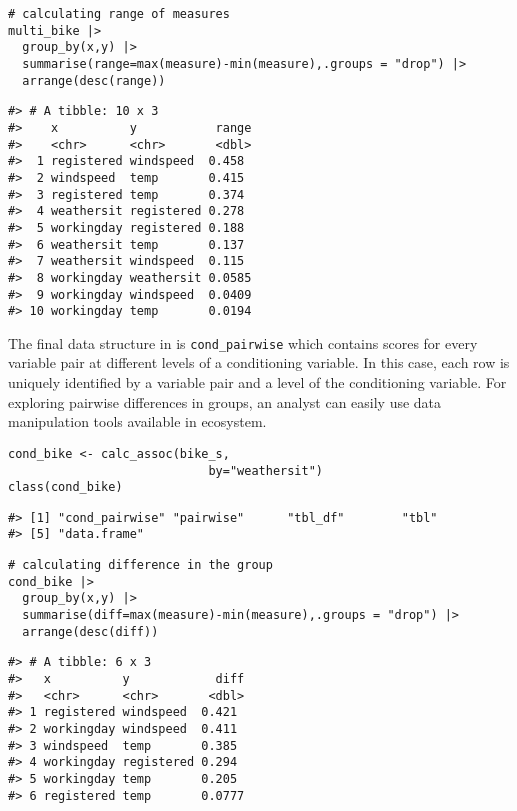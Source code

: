 \begin{verbatim}
# calculating range of measures
multi_bike |> 
  group_by(x,y) |>
  summarise(range=max(measure)-min(measure),.groups = "drop") |>
  arrange(desc(range))
\end{verbatim}

\begin{verbatim}
#> # A tibble: 10 x 3
#>    x          y           range
#>    <chr>      <chr>       <dbl>
#>  1 registered windspeed  0.458 
#>  2 windspeed  temp       0.415 
#>  3 registered temp       0.374 
#>  4 weathersit registered 0.278 
#>  5 workingday registered 0.188 
#>  6 weathersit temp       0.137 
#>  7 weathersit windspeed  0.115 
#>  8 workingday weathersit 0.0585
#>  9 workingday windspeed  0.0409
#> 10 workingday temp       0.0194
\end{verbatim}

The final data structure in  is \texttt{cond\_pairwise} which contains scores for every variable pair at different levels of a conditioning variable. In this case, each row is uniquely identified by a variable pair and a level of the conditioning variable. For exploring pairwise differences in groups, an analyst can easily use data manipulation tools available in  ecosystem.

\begin{verbatim}
cond_bike <- calc_assoc(bike_s,
                            by="weathersit")
class(cond_bike)
\end{verbatim}

\begin{verbatim}
#> [1] "cond_pairwise" "pairwise"      "tbl_df"        "tbl"          
#> [5] "data.frame"
\end{verbatim}

\begin{verbatim}
# calculating difference in the group
cond_bike |> 
  group_by(x,y) |>
  summarise(diff=max(measure)-min(measure),.groups = "drop") |>
  arrange(desc(diff))
\end{verbatim}

\begin{verbatim}
#> # A tibble: 6 x 3
#>   x          y            diff
#>   <chr>      <chr>       <dbl>
#> 1 registered windspeed  0.421 
#> 2 workingday windspeed  0.411 
#> 3 windspeed  temp       0.385 
#> 4 workingday registered 0.294 
#> 5 workingday temp       0.205 
#> 6 registered temp       0.0777
\end{verbatim}

